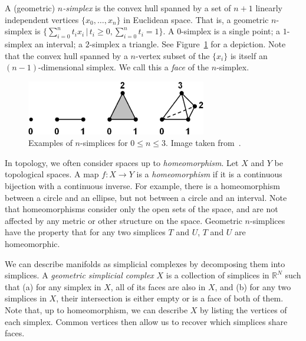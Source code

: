 \documentclass[a4paper,11pt,leqno]{article} \usepackage{amsmath}
\newcommand{\RR}{\mathbb{R}} \newcommand{\QQ}{\mathbb{Q}}
\theoremstyle{definition} \newtheorem{defn}{Definition}
\begin{document}
A (geometric) \emph{$n$-simplex} is the convex hull spanned by a set of $n+1$
linearly independent vertices $\{x_0,\dots, x_n\}$ in Euclidean space.  That is,
a geometric $n$-simplex is $\{\sum_{i=0}^n t_ix_i\,|\, t_i\geq 0, \sum_{i=0}^n
t_i = 1\}$.  A $0$-simplex is a single point; a $1$-simplex an interval;
a $2$-simplex a triangle.  See Figure~\ref{fig_simplices} for a depiction.  Note
that the convex hull spanned by a $n$-vertex subset of the $\{x_i\}$ is itself
an $(n-1)$-dimensional simplex.  We call this a \emph{face} of the $n$-simplex.

\begin{figure} \centering
\includegraphics[width=0.7\textwidth]{figures/simp2.jpg} \caption{Examples of
$n$-simplices for $0\leq n\leq 3$. Image taken from~\cite{Friedman08}.}
\label{fig_simplices} \end{figure}

In topology, we often consider spaces up to \emph{homeomorphism}.  Let $X$ and
$Y$ be topological spaces.  A map $f: X\to Y$ is a \emph{homeomorphism} if it is
a continuous bijection with a continuous inverse.  For example, there is
a homeomorphism between a circle and an ellipse, but not between a circle and an
interval.  Note that homeomorphisms consider only the open sets of the space,
and are not affected by any metric or other structure on the space.  Geometric
$n$-simplices have the property that for any two simplices $T$ and $U$, $T$ and
$U$ are homeomorphic.

We can describe manifolds as simplicial complexes by decomposing them into
simplices.  A \emph{geometric simplicial complex} $X$ is a collection of
simplices in $\RR^N$ such that (a) for any simplex in $X$, all of its faces are
also in $X$, and (b) for any two simplices in $X$, their intersection is either
empty or is a face of both of them.  Note that, up to homeomorphism, we can
describe $X$ by listing the vertices of each simplex.  Common vertices then
allow us to recover which simplices share faces.
\end{document}
